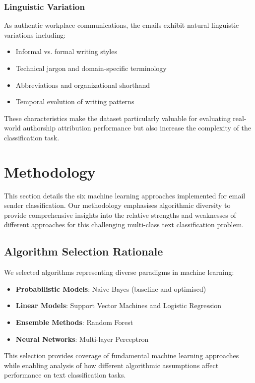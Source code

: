 \documentclass[11pt,a4paper]{article}
\begin{document}
\subsubsection{Linguistic Variation}

As authentic workplace communications, the emails exhibit natural linguistic variations including:
\begin{itemize}
    \item Informal vs. formal writing styles
    \item Technical jargon and domain-specific terminology
    \item Abbreviations and organizational shorthand
    \item Temporal evolution of writing patterns
\end{itemize}

These characteristics make the dataset particularly valuable for evaluating real-world authorship attribution performance but also increase the complexity of the classification task.

\section{Methodology}

This section details the six machine learning approaches implemented for email sender classification. Our methodology emphasises algorithmic diversity to provide comprehensive insights into the relative strengths and weaknesses of different approaches for this challenging multi-class text classification problem.

\subsection{Algorithm Selection Rationale}

We selected algorithms representing diverse paradigms in machine learning:

\begin{itemize}
    \item \textbf{Probabilistic Models}: Naive Bayes (baseline and optimised)
    \item \textbf{Linear Models}: Support Vector Machines and Logistic Regression
    \item \textbf{Ensemble Methods}: Random Forest
    \item \textbf{Neural Networks}: Multi-layer Perceptron
\end{itemize}

This selection provides coverage of fundamental machine learning approaches while enabling analysis of how different algorithmic assumptions affect performance on text classification tasks.
\end{document}
